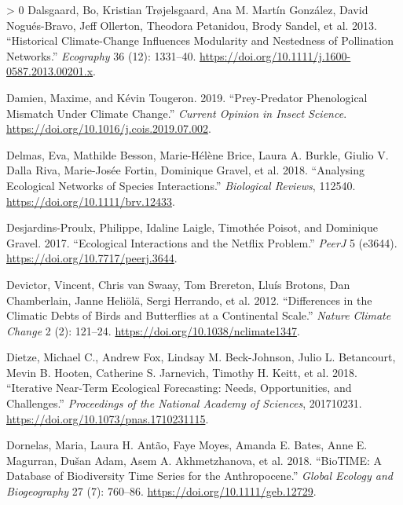 \documentclass[11pt]{article}
\newlength{\cslhangindent}
\newenvironment{CSLReferences}[3] %
 {%
  \setlength{\parindent}{0pt}
  \ifodd #1 \everypar{\setlength{\hangindent}{\cslhangindent}}\ignorespaces\fi
  \ifnum #2 > 0
  \setlength{\parskip}{#2\baselineskip}
  \fi
 }%
 {}
\begin{document}
\begin{CSLReferences}{1}{0}
\leavevmode\hypertarget{ref-Dalsgaard2013HisCli}{}%
Dalsgaard, Bo, Kristian Trøjelsgaard, Ana M. Martín González, David
Nogués-Bravo, Jeff Ollerton, Theodora Petanidou, Brody Sandel, et al.
2013. {``Historical Climate-Change Influences Modularity and Nestedness
of Pollination Networks.''} \emph{Ecography} 36 (12): 1331--40.
\url{https://doi.org/10.1111/j.1600-0587.2013.00201.x}.

\leavevmode\hypertarget{ref-Damien2019PrePhe}{}%
Damien, Maxime, and Kévin Tougeron. 2019. {``Prey-Predator Phenological
Mismatch Under Climate Change.''} \emph{Current Opinion in Insect
Science}. \url{https://doi.org/10.1016/j.cois.2019.07.002}.

\leavevmode\hypertarget{ref-Delmas2018AnaEco}{}%
Delmas, Eva, Mathilde Besson, Marie-Hélène Brice, Laura A. Burkle,
Giulio V. Dalla Riva, Marie-Josée Fortin, Dominique Gravel, et al. 2018.
{``Analysing Ecological Networks of Species Interactions.''}
\emph{Biological Reviews}, 112540.
\url{https://doi.org/10.1111/brv.12433}.

\leavevmode\hypertarget{ref-Desjardins-Proulx2017EcoInt}{}%
Desjardins-Proulx, Philippe, Idaline Laigle, Timothée Poisot, and
Dominique Gravel. 2017. {``Ecological Interactions and the Netflix
Problem.''} \emph{PeerJ} 5 (e3644).
\url{https://doi.org/10.7717/peerj.3644}.

\leavevmode\hypertarget{ref-Devictor2012DifCli}{}%
Devictor, Vincent, Chris van Swaay, Tom Brereton, Lluís Brotons, Dan
Chamberlain, Janne Heliölä, Sergi Herrando, et al. 2012. {``Differences
in the Climatic Debts of Birds and Butterflies at a Continental
Scale.''} \emph{Nature Climate Change} 2 (2): 121--24.
\url{https://doi.org/10.1038/nclimate1347}.

\leavevmode\hypertarget{ref-Dietze2018IteNea}{}%
Dietze, Michael C., Andrew Fox, Lindsay M. Beck-Johnson, Julio L.
Betancourt, Mevin B. Hooten, Catherine S. Jarnevich, Timothy H. Keitt,
et al. 2018. {``Iterative Near-Term Ecological Forecasting: Needs,
Opportunities, and Challenges.''} \emph{Proceedings of the National
Academy of Sciences}, 201710231.
\url{https://doi.org/10.1073/pnas.1710231115}.

\leavevmode\hypertarget{ref-Dornelas2018BioDat}{}%
Dornelas, Maria, Laura H. Antão, Faye Moyes, Amanda E. Bates, Anne E.
Magurran, Dušan Adam, Asem A. Akhmetzhanova, et al. 2018. {``BioTIME: A
Database of Biodiversity Time Series for the Anthropocene.''}
\emph{Global Ecology and Biogeography} 27 (7): 760--86.
\url{https://doi.org/10.1111/geb.12729}.


\end{CSLReferences}
\end{document}
